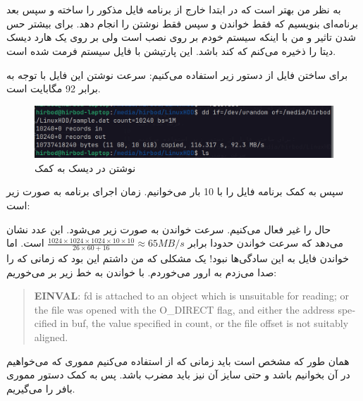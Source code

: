 \section{}
به نظر من بهتر است که در ابتدا خارج از برنامه فایل مذکور را ساخته و سپس بعد برنامه‌ای بنویسیم که فقط خواندن و سپس
فقط نوشتن را انجام دهد. برای بیشتر حس شدن تاثیر
 و 
من با اینکه سیستم خودم بر روی
نصب است ولی بر روی یک هارد دیسک دیتا را ذخیره می‌کنم که کند باشد. این پارتیشن با فایل سیستم
فرمت شده است.

برای ساختن فایل از دستور زیر استفاده می‌کنیم:
سرعت نوشتن این فایل با توجه به
برابر 92 مگابایت است.
\begin{figure}[H]
    \centering
    \includegraphics[scale=0.4]{pic/1-dd.png}
    \caption{نوشتن در دیسک به کمک }
\end{figure}


سپس به کمک برنامه فایل را با
10 بار می‌خوانیم.
زمان اجرای برنامه به صورت زیر است:

حال
را غیر فعال می‌کنیم. سرعت خواندن به صورت زیر می‌شود. این عدد نشان می‌دهد که سرعت خواندن حدودا برابر
$\frac{1024 \times 1024 \times 1024 \times 10 \times 10}{26 \times 60 + 16} \approx 65 MB/s$
است.
اما خواندن فایل به این سادگی‌ها نبود! یک مشکلی که من داشتم این بود که زمانی که
را صدا می‌زدم به ارور
می‌خوردم. با خواندن
به خط زیر بر می‌خوریم:
\begin{latin}
\begin{quote}
    \textbf{EINVAL}: fd is attached to an object which is unsuitable for reading; or the file was opened with the O\_DIRECT flag, and either the address specified in buf,
    the value specified in count, or the file offset is not suitably aligned.
\end{quote}
\end{latin}
همان طور که مشخص است باید زمانی که از
استفاده می‌کنیم مموری که می‌خواهیم در آن بخوانیم
باشد و حتی سایز آن نیز باید مضرب  باشد. پس به کمک دستور
مموری بافر را می‌گیریم.

